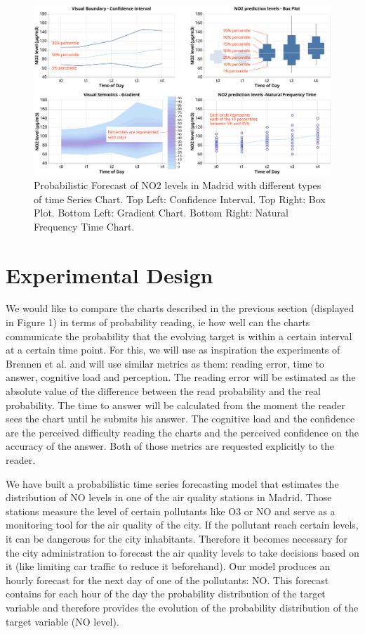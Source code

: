 \documentclass[a4paper,3p,sort&compress]{elsarticle}
\begin{document}
\begin{figure}
  \centering
  \includegraphics[width=.9\textwidth]{charts_vector} 
  \caption{\label{figure:charts} Probabilistic Forecast of NO2 levels in Madrid with different types of time Series Chart. 
  Top Left: Confidence Interval. Top Right: Box Plot. 
  Bottom Left: Gradient Chart. Bottom Right: Natural Frequency Time Chart. }
\end{figure} 

\section{Experimental Design}
\label{sec:exp_design}

We would like to compare the charts described in the previous section (displayed in Figure 1) 
in terms of probability 
reading, ie how well 
can the charts communicate the probability that the evolving target is within a certain interval 
at a certain time point.
 For this, we will use as inspiration the experiments of Brennen et al. \cite{brennen_instrument_2018}
and will use similar metrics 
as them: reading error, time to answer, cognitive load and perception. The reading error will be estimated as the 
absolute value of the difference between the read probability and the real probability. The time to answer 
will be calculated from the moment the reader sees the chart until he submits his answer. The cognitive 
load and the confidence are the perceived difficulty reading the charts and the perceived confidence on 
the accuracy of 
the answer. Both of those metrics are requested explicitly to the reader.

We have built a probabilistic time series forecasting model that estimates the distribution of NO 
levels in one of the air quality stations in Madrid. Those stations measure the level of certain 
pollutants like O3 or NO and serve as a monitoring tool for the air quality of the city. If the pollutant 
reach certain levels, it can be dangerous for the city inhabitants. Therefore it becomes necessary 
for the city administration to 
forecast the air quality levels to take decisions based on it (like limiting car traffic to reduce it beforehand).
Our model produces an hourly forecast for the next day of one of the pollutants: NO. This forecast contains
for each hour of the day the probability distribution of the target variable and therefore provides the evolution 
of the probability distribution of the target variable (NO level).
\end{document}
